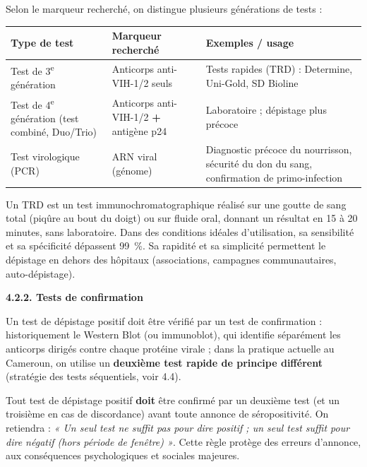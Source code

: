 \documentclass[11pt]{article}
\newcommand{\cle}[1]{{\popxbold\color{popdark}#1}}
\begin{document}
Selon le marqueur recherché, on distingue plusieurs générations de tests :

\begin{center}
\begin{tabularx}{\linewidth}{|l|X|X|}
\hline
\rowcolor{popblueL} \textbf{Type de test} & \textbf{Marqueur recherché} & \textbf{Exemples / usage} \\
\hline
Test de 3\textsuperscript{e} génération & Anticorps anti-VIH-1/2 seuls & Tests rapides (TRD) : Determine, Uni-Gold, SD Bioline \\
\hline
Test de 4\textsuperscript{e} génération (test combiné, Duo/Trio) & Anticorps anti-VIH-1/2 \textbf{+} antigène p24 & Laboratoire ; dépistage plus précoce \\
\hline
Test virologique (PCR) & ARN viral (génome) & Diagnostic précoce du nourrisson, sécurité du don du sang, confirmation de primo-infection \\
\hline
\end{tabularx}
\end{center}

\begin{definition}
Un \cle{TRD} est un test \cle{immunochromatographique} réalisé sur une goutte de sang total (piqûre au bout du doigt) ou sur fluide oral, donnant un résultat en 15 à 20 minutes, sans laboratoire. Dans des conditions idéales d'utilisation, sa \cle{sensibilité} et sa \cle{spécificité} dépassent 99~\%. Sa rapidité et sa simplicité permettent le dépistage en dehors des hôpitaux (associations, campagnes communautaires, auto-dépistage).
\end{definition}

\textbf{4.2.2. Tests de confirmation}

Un test de dépistage positif doit être vérifié par un test de \cle{confirmation} : historiquement le \cle{Western Blot} (ou immunoblot), qui identifie séparément les anticorps dirigés contre chaque protéine virale ; dans la pratique actuelle au Cameroun, on utilise un \textbf{deuxième test rapide de principe différent} (stratégie des tests séquentiels, voir 4.4).

\begin{propriete}
Tout test de dépistage positif \textbf{doit} être confirmé par un deuxième test (et un troisième en cas de discordance) avant toute annonce de séropositivité. On retiendra : \emph{« Un seul test ne suffit pas pour dire positif ; un seul test suffit pour dire négatif (hors période de fenêtre) »}. Cette règle protège des erreurs d'annonce, aux conséquences psychologiques et sociales majeures.
\end{propriete}
\end{document}
